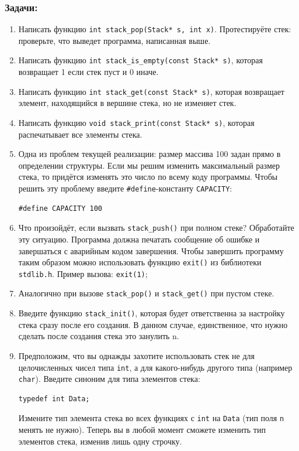 \documentclass{article}
\begin{document}
\subsubsection*{Задачи:}
\begin{enumerate}
\item Написать функцию \texttt{int stack\_pop(Stack* s, int x)}. Протестируёте стек: проверьте, что выведет программа, написанная выше.
\item Написать функцию \texttt{int stack\_is\_empty(const Stack* s)}, которая возвращает 1 если стек пуст и 0 иначе.
\item Написать функцию \texttt{int stack\_get(const Stack* s)}, которая возвращает элемент, находящийся в вершине стека, но не изменяет стек.
\item Написать функцию \texttt{void stack\_print(const Stack* s)}, которая распечатывает все элементы стека.
\item Одна из проблем текущей реализации: размер массива 100 задан прямо в определении структуры. Если мы решим изменить максимальный размер стека, то придётся изменять это число по всему коду программы.  Чтобы решить эту проблему введите \texttt{\#define}-константу \texttt{CAPACITY}:
\begin{lstlisting}
#define CAPACITY 100
\end{lstlisting}
\item Что произойдёт, если вызвать \texttt{stack\_push()} при полном стеке? Обработайте эту ситуацию. Программа должна печатать сообщение об ошибке и завершаться с аварийным кодом завершения. Чтобы завершить программу таким образом можно использовать функцию \texttt{exit()} из библиотеки \texttt{stdlib.h}. Пример вызова: \texttt{exit(1)};
\item Аналогично при вызове \texttt{stack\_pop()} и \texttt{stack\_get()} при пустом стеке.
\item Введите функцию \texttt{stack\_init()}, которая будет ответственна за настройку стека сразу после его создания. В данном случае, единственное, что нужно сделать после создания стека это занулить n.
\item Предположим, что вы однажды захотите использовать стек не для целочисленных чисел типа \texttt{int}, а для какого-нибудь другого типа (например \texttt{char}). Введите синоним для типа элементов стека:
\begin{verbatim}
typedef int Data;
\end{verbatim}
Измените тип элемента стека во всех функциях с \texttt{int} на \texttt{Data} (тип поля \texttt{n} менять не нужно). Теперь вы в любой момент сможете изменить тип элементов стека, изменив лишь одну строчку.

\end{enumerate}
\end{document}
